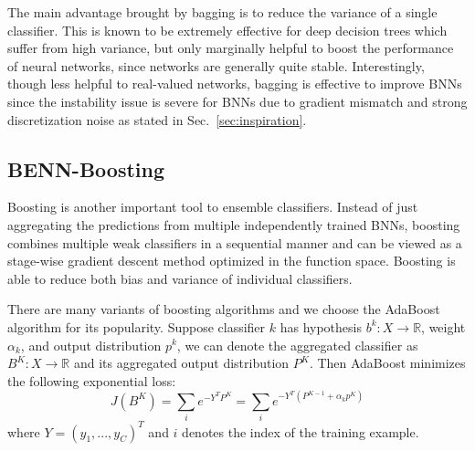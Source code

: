 \documentclass[10pt,twocolumn,letterpaper]{article}
\begin{document}
The main advantage brought by bagging is to reduce the variance of a single classifier. This is known to be extremely effective for deep decision trees which suffer from high variance, but only marginally helpful to boost the performance of neural networks, since networks are generally quite stable. 
Interestingly, though less helpful to real-valued networks, bagging is effective to improve BNNs since the instability issue is severe for BNNs due to gradient mismatch and strong discretization noise as stated in Sec.~\ref{sec:inspiration}. %


\subsection{BENN-Boosting}  

Boosting is another important tool to ensemble classifiers. Instead of just aggregating the predictions from multiple independently trained BNNs, boosting combines multiple weak classifiers in a sequential manner and can be viewed as a stage-wise gradient descent method optimized in the function space. Boosting is able to reduce both bias and variance of individual classifiers.  %

There are many variants of boosting algorithms and we choose the AdaBoost~\cite{freund1995desicion} algorithm for its popularity. Suppose classifier $k$ has hypothesis $b^{k}:X \rightarrow \mathbb R$, weight $\alpha_{k}$, and output distribution $p^{k}$, we can denote the aggregated classifier as $B^{K}:X \rightarrow \mathbb R$ and its aggregated output distribution $P^{K}$. Then AdaBoost minimizes the following exponential loss:
\[
    J(B^{K}) = \sum_{i}e^{-Y^{T}P^{K}} = \sum_{i}e^{-Y^{T}(P^{K-1}+\alpha_{k}p^{K})}
\]
where $Y = (y_{1}, ..., y_{C})^{T}$ and $i$ denotes the index of the training example. %
\end{document}
